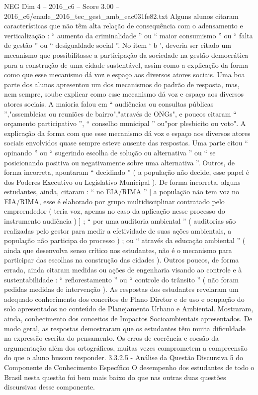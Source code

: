 \begin{textsample}{NEG Dim 4 – 2016\_c6 – Score 3.00 – 2016\_c6/enade\_2016\_tec\_gest\_amb\_eac031fe82.txt}
Alguns alunos citaram características que não têm alta relação de consequência com o adensamento e verticalização : “ aumento da criminalidade ” ou “ maior consumismo ” ou “ falta de gestão ” ou “ desigualdade social ”.
No item ‘ b ’, deveria ser citado um mecanismo que possibilitasse a participação da sociedade na gestão democrática para a construção de uma cidade sustentável, assim como a explicação da forma como que esse mecanismo dá voz e espaço aos diversos atores sociais.
Uma boa parte dos alunos apresentou um dos mecanismos do padrão de resposta, mas, nem sempre, soube explicar como esse mecanismo dá voz e espaço aos diversos atores sociais.
A maioria falou em “ audiências ou consultas públicas ”,"assembleias ou reuniões de bairro","através de ONGs", e poucos citaram “ orçamento participativo ”, “ conselho municipal ” ou"por plesbicito ou voto".
A explicação da forma com que esse mecanismo dá voz e espaço aos diversos atores sociais envolvidos quase sempre esteve ausente das respostas.
Uma parte citou “ opinando ” ou “ sugerindo escolha de solução ou alternativa ” ou “ se posicionando positiva ou negativamente sobre uma alternativa ”.
Outros, de forma incorreta, apontaram “ decidindo ” ( a população não decide, esse papel é dos Poderes Executivo ou Legislativo Municipal ).
De forma incorreta, alguns estudantes, ainda, citaram : “ no EIA/RIMA ” [ a população não tem voz no EIA/RIMA, esse é elaborado por grupo multidisciplinar contratado pelo empreendedor ( teria voz, apenas no caso da aplicação nesse processo do instrumento audiência ) ] ; “ por uma auditoria ambiental ” ( auditorias são realizadas pelo gestor para medir a efetividade de suas ações ambientais, a população não participa do processo ) ; ou “ através da educação ambiental ” ( ainda que desenvolva senso crítico nos estudantes, não é o mecanismo para participar das escolhas na construção das cidades ).
Outros poucos, de forma errada, ainda citaram medidas ou ações de engenharia visando ao controle e à sustentabilidade : “ reflorestamento ” ou “ controle do trânsito ” ( não foram pedidas medidas de intervenção ).
As respostas dos estudantes revelaram um adequado conhecimento dos conceitos de Plano Diretor e de uso e ocupação do solo apresentados no conteúdo de Planejamento Urbano e Ambiental.
Mostraram, ainda, conhecimento dos conceitos de Impactos Socioambientais apresentados.
De modo geral, as respostas demostraram que os estudantes têm muita dificuldade na expressão escrita do pensamento.
Os erros de coerência e coesão da argumentação além dos ortográficos, muitas vezes comprometem a compreensão do que o aluno buscou responder. 3.3.2.5 - Análise da Questão Discursiva 5 do Componente de Conhecimento Específico O desempenho dos estudantes de todo o Brasil nesta questão foi bem mais baixo do que nas outras duas questões discursivas desse componente.

\end{textsample}
